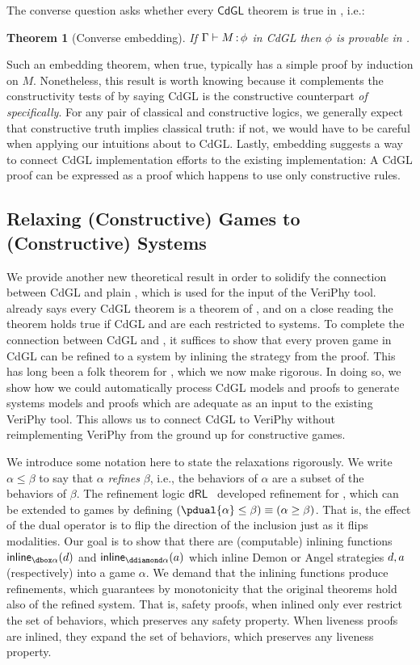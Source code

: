 \documentclass[12pt]{cmuthesis}
\newtheorem{theorem}{Theorem}
\theoremstyle{definition}
\theoremstyle{remark}
\newcommand{\rref}[2][]{\prettyref{#2}}
\newcommand{\dRL}{\ensuremath{\mathsf{dRL}}\xspace}
\newcommand{\CdGL}{\textsf{CdGL}\xspace}
\newcommand{\VeriPhy}{VeriPhy\xspace}
\begin{document}
The converse question asks whether every $\CdGL$ theorem is true in \dGL, i.e.:
\begin{theorem}[Converse embedding]
If $\Gamma\allowbreak\vdash M \allowbreak \mathop{:} \phi$ in \CdGL then $\phi$ is provable in \dGL.
\label{thm:conv-embed}
\end{theorem}
Such an embedding theorem, when true, typically has a simple proof by induction on $M$.
Nonetheless, this result is worth knowing because it complements the constructivity tests of \rref{ch:cgl} by saying \CdGL is the constructive counterpart \emph{of \dGL specifically}.
For any pair of classical and constructive logics, we generally expect that constructive truth implies classical truth: if not, we would have to be careful when applying our intuitions about \dGL to \CdGL.
Lastly, embedding suggests a way to connect \CdGL implementation efforts to the existing \dGL implementation: A \CdGL proof can be expressed as a \dGL proof which happens to use only constructive rules.

\subsection{Relaxing (Constructive) Games to (Constructive) Systems}
We provide another new theoretical result in order to solidify the connection between \CdGL and plain \dL, which is used for the input of the \VeriPhy tool.
\rref{thm:conv-embed} already says every \CdGL theorem is a theorem of \dGL, and on a close reading the theorem holds true if \CdGL and \dGL are each restricted to systems.
To complete the connection between \CdGL and \dL, it suffices to show that every proven game in \CdGL can be refined to a system by inlining the strategy from the proof.
This has long been a folk theorem for \dGL, which we now make rigorous.
In doing so, we show how we could automatically process \CdGL models and proofs to generate systems models and proofs which are adequate as an input to the existing \VeriPhy tool.
This allows us to connect \CdGL to \VeriPhy without reimplementing \VeriPhy from the ground up for constructive games.

We introduce some notation here to state the relaxations rigorously.
We write $\alpha \leq \beta$ to say that $\alpha$ \emph{refines} $\beta$, i.e., the behaviors of $\alpha$ are a subset of the behaviors of $\beta$.
The refinement logic \dRL~\cite{DBLP:conf/lics/LoosP16} developed refinement for \dL, which can be extended to games by defining $(\pdual{\alpha} \leq \beta) \equiv (\alpha \geq \beta)$.
That is, the effect of the dual operator is to flip the direction of the inclusion just as it flips modalities.
Our goal is to show that there are (computable) inlining functions $\dinline{\alpha}{\da}$ and $\ainline{\alpha}{\aa}$ which inline Demon or Angel strategies $d,a$ (respectively) into a game $\alpha$.
We demand that the inlining functions produce refinements, which guarantees by monotonicity that the original theorems hold also of the refined system.
That is, safety proofs, when inlined only ever restrict the set of behaviors, which preserves any safety property.
When liveness proofs are inlined, they expand the set of behaviors, which preserves any liveness property.
\end{document}
